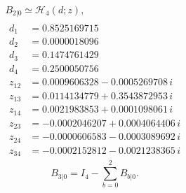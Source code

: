 \documentclass[11pt]{article}
\begin{document}
\[
\begin{gathered}
B_{2|0}\simeq\mathcal H_4(d;z),\\[3pt]
\begin{aligned}
d_1&=0.8525169715 \\
d_2&=0.0000018096 \\
d_3&=0.1474761429 \\
d_4&=0.2500050756 \\
z_{12}&=0.0009606328-0.0005269708\,i \\
z_{13}&=0.0114134779+0.3543872953\,i \\
z_{14}&=0.0021983853+0.0001098061\,i \\
z_{23}&=-0.0002046207+0.0004064406\,i \\
z_{24}&=-0.0000606583-0.0003089692\,i \\
z_{34}&=-0.0002152812-0.0021238365\,i
\end{aligned}
\end{gathered}
\]
\[
B_{3|0}=I_4-\sum_{b=0}^2B_{b|0}.
\]
\end{document}
